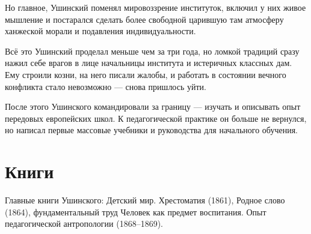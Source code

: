 Но главное, Ушинский поменял мировоззрение институток, включил у них живое мышление и постарался сделать более свободной царившую там атмосферу ханжеской морали и подавления индивидуальности.

Всё это Ушинский проделал меньше чем за три года, но ломкой традиций сразу нажил себе врагов в лице начальницы института и истеричных классных дам. Ему строили козни, на него писали жалобы, и работать в состоянии вечного конфликта стало невозможно — снова пришлось уйти.

После этого Ушинского командировали за границу — изучать и описывать опыт передовых европейских школ. К педагогической практике он больше не вернулся, но написал первые массовые учебники и руководства для начального обучения.

\section*  {Книги}
Главные книги Ушинского: Детский мир. Хрестоматия (1861), Родное слово (1864), фундаментальный труд Человек как предмет воспитания. Опыт педагогической антропологии (1868–1869).

